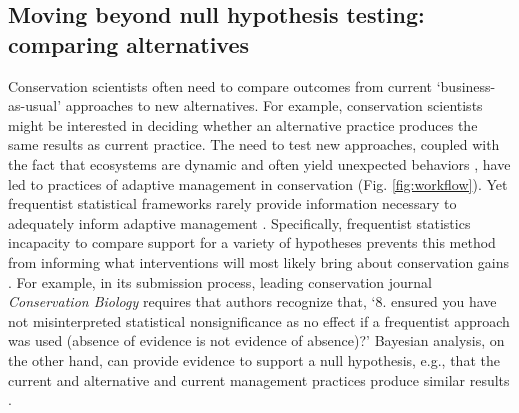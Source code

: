 \documentclass{article}
\begin{document}
\subsection*{Moving beyond null hypothesis testing: comparing alternatives}
\par Conservation scientists often need to compare outcomes from current `business-as-usual' approaches to new alternatives. For example, conservation scientists might be interested in deciding whether an alternative practice produces the same results as current practice. 
The need to test new approaches, coupled with the fact that ecosystems are dynamic and often yield unexpected behaviors \citep{Levin2012,Gross2013}, have led to practices of adaptive management in conservation \citep{holling1978adaptive} (Fig. \ref{fig:workflow}). Yet frequentist statistical frameworks rarely provide information necessary to adequately inform adaptive management \citep{prato2005bayesian}.  Specifically, frequentist statistics incapacity to compare support for a variety of hypotheses \citep[including a `null' hypothesis;][]{Zyl2018} prevents this method from informing what interventions will most likely bring about conservation gains \citep{prato2005bayesian}. For example, in its submission process, leading conservation journal \textit{Conservation Biology} requires that authors recognize that, `8. ensured you have not misinterpreted statistical nonsignificance as no effect if a frequentist approach was used (absence of evidence is not evidence of absence)?' Bayesian analysis, on the other hand, can provide evidence to support a null hypothesis, e.g., that the current and alternative and current management practices produce similar results \citep{gallistel2009importance}.
\end{document}

